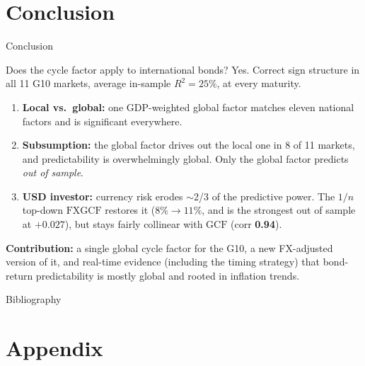 \documentclass[10pt]{beamer}
\newcommand{\GCF}{\mathrm{GCF}}
\newcommand{\FXGCF}{\mathrm{FXGCF}}
\begin{document}
\section{Conclusion}

\begin{frame}{Conclusion}
  \begin{block}{Does the \citet{cieslak2015} cycle factor apply to
      international bonds? Yes.}
    Correct sign structure in all 11 G10 markets, average in-sample
    $R^{2}=25\%$, at every maturity.
  \end{block}
  \begin{enumerate}
    \item \textbf{Local vs.\ global:} one GDP-weighted global factor matches
      eleven national factors and is significant everywhere.
    \item \textbf{Subsumption:} the global factor drives out the local one in
      8 of 11 markets, and predictability is overwhelmingly global. Only
      the global factor predicts \emph{out of sample}.
    \item \textbf{USD investor:} currency risk erodes $\sim$2/3 of the
      predictive power. The $1/n$ top-down $\FXGCF$ restores it ($8\%\to11\%$,
      and is the strongest out of sample at $+0.027$), but stays fairly
      collinear with $\GCF$ (corr \textbf{0.94}).
  \end{enumerate}
  \vfill
  \textbf{Contribution:} a single global cycle factor for the G10, a new
  FX-adjusted version of it, and real-time evidence (including the timing
  strategy) that bond-return predictability is mostly global and rooted in
  inflation trends.
\end{frame}

\begin{frame}{Bibliography}
  \small
  
\end{frame}

\appendix
\section{Appendix}
\end{document}
